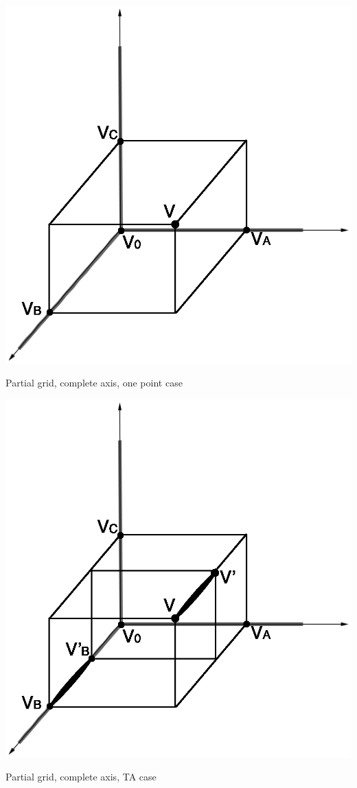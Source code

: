 \begin{multicols}{2}
{\begin{figurehere}
\begin{center}
\includegraphics[scale=0.40]{Interpolation-AXE-INS.eps}
\caption{Partial grid, complete axis, one point case}
\label{figNCRAXEINS}
\end{center}
\end{figurehere}

\begin{figurehere}
\begin{center}
\includegraphics[scale=0.40]{Interpolation-AXE-TA.eps}
\caption{Partial grid, complete axis, TA case}
\label{figNCRAXETA}
\end{center}
\end{figurehere}

}
\end{multicols}
